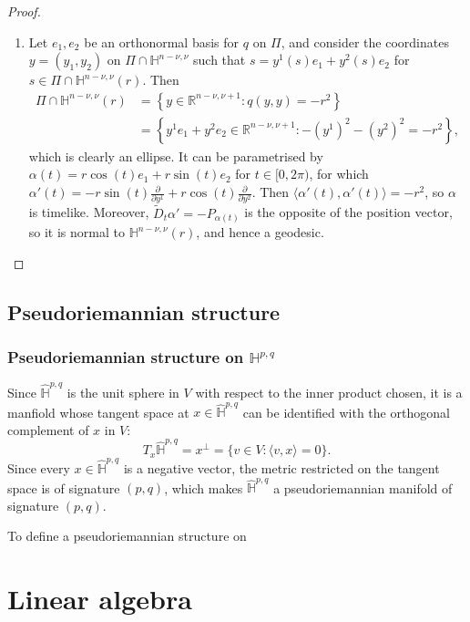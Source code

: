 \documentclass{report}
\begin{document}
\begin{proof}
    \begin{enumerate}[label=(\roman*)]
        \item Let $e_1, e_2$ be an orthonormal basis for $q$ on $\Pi$, and consider the coordinates $y = (y_1, y_2)$ on $\Pi \cap \mathbb H^{n - \nu, \nu}$ such that $s = y^1(s)e_1 + y^2(s)e_2$ for $s \in \Pi \cap \mathbb H^{n - \nu, \nu}(r)$.
        Then
        \begin{align*}
            \Pi \cap \mathbb H^{n - \nu, \nu}(r) &= \left\{ y \in \mathbb R^{n - \nu, \nu + 1} : q(y,y) = -r^2 \right\}\\
            &= \left\{ y^1 e_1 + y^2 e_2 \in \mathbb R^{n - \nu, \nu + 1} : -(y^1)^2 - (y^2)^2 = -r^2 \right\},
        \end{align*}
        which is clearly an ellipse.
        It can be parametrised by $\alpha(t) = r \cos(t)e_1 + r \sin(t)e_2$ for $t \in [0, 2\pi)$, for which $\alpha'(t) = -r \sin(t) \frac{\partial}{\partial y^1} + r \cos(t) \frac{\partial}{\partial y^2}$.
        Then $\langle \alpha'(t), \alpha'(t) \rangle = -r^2$, so $\alpha$ is timelike.
        Moreover, $\tilde D_t \alpha' = - P_{\alpha(t)}$ is the opposite of the position vector, so it is normal to $\mathbb H^{n - \nu, \nu}(r)$, and hence a geodesic.
    \end{enumerate}
\end{proof}
\section{Pseudoriemannian structure}
\subsection{Pseudoriemannian structure on $\mathbb H^{p,q}$}
Since $\hat{\mathbb H}^{p,q}$ is the unit sphere in $V$ with respect to the inner product chosen, it is a manfiold whose tangent space at $x \in \hat{\mathbb H}^{p,q}$ can be identified with the orthogonal complement of $x$ in $V$:
\[
T_x \hat{\mathbb H}^{p,q} = x^\perp = \{ v \in V : \langle v, x \rangle = 0 \}.
\] 
Since every $x \in \hat{\mathbb H}^{p,q}$ is a negative vector, the metric restricted on the tangent space is of signature $(p,q)$, which makes $\hat{\mathbb H}^{p,q}$ a pseudoriemannian manifold of signature $(p,q)$.

To define a pseudoriemannian structure on 

\chapter{Linear algebra}
\end{document}
